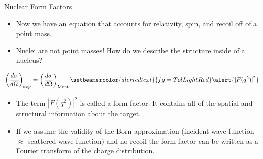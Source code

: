 \documentclass[10pt]{beamer}
\begin{document}
\begin{frame}[fragile]{Nuclear Form Factors}
	\begin{itemize}
		\item Now we have an equation that accounts for relativity, spin, and recoil off of a point mass.
		\pause
		\item \alert{Nuclei are not point masses}! How do we describe the structure inside of a nucleus? 
	\end{itemize} 
	\begin{equation} \label{eq:xs_exp_ff}
	\left(\frac{d\sigma}{d\Omega}\right)_{exp} = \left(\frac{d\sigma}{d\Omega}\right)_{\substack{ \text{Mott}}} \setbeamercolor{alerted text}{fg=TolLightRed}\alert{|F(q^2)|^2}
	\end{equation}
	\begin{itemize}
		\pause
		\item The term \alert{$|F(q^2)|^2$} is called a \alert{form factor}. It contains all of the spatial and structural information about the target.
		\item If we assume the validity of the Born approximation (incident wave function $\approx$ scattered wave function) and no recoil the form factor can be written as a \alert{Fourier transform of the charge distribution}.
	\end{itemize} 
\end{frame}
\end{document}
